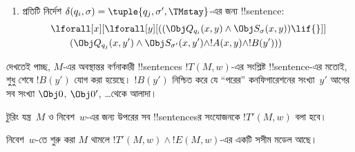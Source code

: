 \documentclass[../../../include/open-logic-section]{subfiles}
\begin{document}
\begin{enumerate}
\begin{enumerate}
\item {} প্রতিটি নির্দেশ
$\delta(q_i,\sigma)=\tuple{q_j,\sigma',\TMstay}$-এর জন্য !!{sentence}:
\begin{align*}
& \lforall[x][\lforall[y][(
   (\Obj Q_{q_i}(x, y) \land \Obj S_{\sigma}(x, y)) \lif {}]] \\
&\qquad (\Obj Q_{q_j}(x, y') \land \Obj S_{\sigma'}(x, y') \land
!A(x, y) \land !B(y')))
\end{align*}
\end{enumerate}
দেখতেই পাচ্ছ, $M$-এর অবস্থান্তর বর্ণনাকারী !!{sentence}s
$!T(M,w)$-এর সংশ্লিষ্ট !!{sentence}-এর মতোই, শুধু শেষে $!B(y')$ যোগ করা
হয়েছে। $!B(y')$ নিশ্চিত করে যে “পরের” কনফিগারেশনের সংখ্যা~$y'$ আগের
সব সংখ্যা $\Obj 0$, $\Obj 0'$, \dots থেকে আলাদা।
\end{enumerate}
টুরিং যন্ত্র~$M$ ও নিবেশ~$w$-এর জন্য উপরের সব !!{sentence}sর সংযোজনকে
$!T'(M,w)$ বলা হবে।

\begin{lem}
  নিবেশ~$w$-তে শুরু করা $M$ থামলে
  $!T'(M,w)\land !E(M,w)$-এর একটি সসীম মডেল আছে।
\end{lem}
\end{document}
